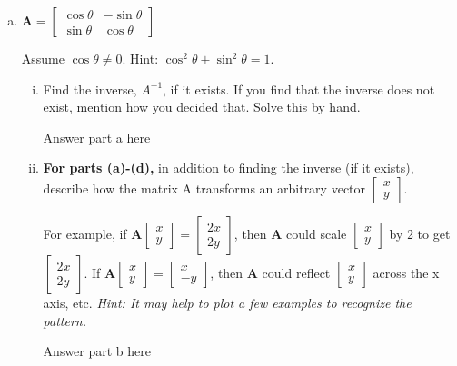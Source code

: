 \documentclass[11pt]{article}
\def\A{\textbf{A}} %
\begin{document}
\begin{enumerate}
\begin{enumerate}[(a)]
	      	\newpage
	      	\item $\A = \begin{bmatrix}
	      	      \cos{\theta} & -\sin{\theta} \\
	      	      \sin{\theta} & \cos{\theta}
	      	\end{bmatrix}$
	      		      		      		                        
	      	Assume $\cos{\theta} \neq 0$. Hint: $\cos^2{\theta} + \sin^2{\theta} = 1$.
	      	\begin{enumerate}[i.]
	      		\item Find the inverse, $A^{-1}$, if it exists. If you find that the inverse does not exist, mention how you decided that. Solve this by hand.
	      		      \begin{Answer}
	      		      	Answer part a here
	      		      \end{Answer}
	      		\item \textbf{For parts (a)-(d),} in addition to finding the inverse (if it exists), describe how the matrix A transforms an arbitrary vector $\begin{bmatrix}
	      		      x \\
	      		      y
	      		\end{bmatrix}$.
	      			      			      		                    
	      		For example, if $\A \begin{bmatrix}
	      		x \\
	      		y
	      		\end{bmatrix} = \begin{bmatrix}
	      		2x \\
	      		2y
	      		\end{bmatrix}$, then $\A$ could scale $\begin{bmatrix}
	      		x \\
	      		y
	      		\end{bmatrix}$ by 2 to get $\begin{bmatrix}
	      		2x \\
	      		2y
	      		\end{bmatrix}$. If $\A \begin{bmatrix}
	      		x \\
	      		y
	      		\end{bmatrix}
	      		=
	      		\begin{bmatrix}
	      			x  \\
	      			-y 
	      		\end{bmatrix}$, then $\A$ could reflect $\begin{bmatrix}
	      		x \\
	      		y
	      		\end{bmatrix}$ across the x axis, etc. \textit{Hint: It may help to plot a few examples to recognize the pattern.}
	      		\begin{Answer}
	      			Answer part b here
	      		\end{Answer}
	      	\end{enumerate}
	      		      		      		                    

\end{enumerate}
\end{enumerate}
\end{document}
